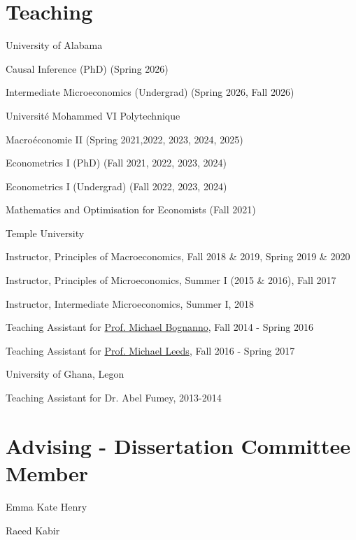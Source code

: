 \documentclass[12pt,letterpaper]{article}
\renewenvironment{itemize}{
  \begin{list}{}{
    \setlength{\leftmargin}{1.5em}
  }
}{
  \end{list}
}
\begin{document}
\section*{Teaching}
\begin{enumerate}
	\item University of Alabama
	\begin{itemize}
		\item Causal Inference (PhD) (Spring 2026)
		\item Intermediate Microeconomics (Undergrad) (Spring 2026, Fall 2026)
	\end{itemize}
	\item Universit\'e Mohammed VI Polytechnique
	\begin{itemize}
		\item Macro\'economie II (Spring 2021,2022, 2023, 2024, 2025)
		\item Econometrics I (PhD) (Fall 2021, 2022, 2023, 2024)
		\item Econometrics I (Undergrad) (Fall 2022, 2023, 2024)
		\item Mathematics and Optimisation for Economists (Fall 2021)
	\end{itemize}
	\item Temple University
	\begin{itemize}
		\item Instructor, Principles of Macroeconomics, Fall 2018 \& 2019, Spring 2019 \& 2020
		\item Instructor, Principles of Microeconomics, Summer I (2015 \& 2016), Fall 2017
		\item Instructor, Intermediate Microeconomics, Summer I, 2018
		\item Teaching Assistant for \href{https://liberalarts.temple.edu/academics/faculty/bognanno-michael}{Prof. Michael Bognanno}, Fall 2014 - Spring 2016
		\item Teaching Assistant for \href{https://liberalarts.temple.edu/academics/faculty/leeds-michael}{Prof. Michael Leeds}, Fall 2016 - Spring 2017
	\end{itemize}
	\item University of Ghana, Legon
	\begin{itemize}
		\item Teaching Assistant for Dr. Abel Fumey, 2013-2014
	\end{itemize}
\end{enumerate}

\section*{Advising - Dissertation Committee Member}
\begin{itemize}
	\item Emma Kate Henry
	\item Raeed Kabir
\end{itemize}
\end{document}
